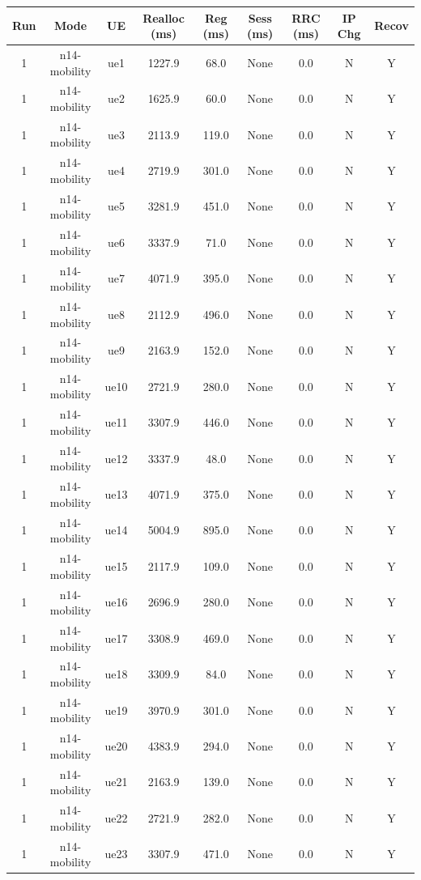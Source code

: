 \begin{table}[ht]
\centering
\begin{tabular}{|c|c|c|c|c|c|c|c|c|}
\hline
Run & Mode & UE & Realloc (ms) & Reg (ms) & Sess (ms) & RRC (ms) & IP Chg & Recov \\
\hline
1 & n14-mobility & ue1 & 1227.9 & 68.0 & None & 0.0 & N & Y \\
1 & n14-mobility & ue2 & 1625.9 & 60.0 & None & 0.0 & N & Y \\
1 & n14-mobility & ue3 & 2113.9 & 119.0 & None & 0.0 & N & Y \\
1 & n14-mobility & ue4 & 2719.9 & 301.0 & None & 0.0 & N & Y \\
1 & n14-mobility & ue5 & 3281.9 & 451.0 & None & 0.0 & N & Y \\
1 & n14-mobility & ue6 & 3337.9 & 71.0 & None & 0.0 & N & Y \\
1 & n14-mobility & ue7 & 4071.9 & 395.0 & None & 0.0 & N & Y \\
1 & n14-mobility & ue8 & 2112.9 & 496.0 & None & 0.0 & N & Y \\
1 & n14-mobility & ue9 & 2163.9 & 152.0 & None & 0.0 & N & Y \\
1 & n14-mobility & ue10 & 2721.9 & 280.0 & None & 0.0 & N & Y \\
1 & n14-mobility & ue11 & 3307.9 & 446.0 & None & 0.0 & N & Y \\
1 & n14-mobility & ue12 & 3337.9 & 48.0 & None & 0.0 & N & Y \\
1 & n14-mobility & ue13 & 4071.9 & 375.0 & None & 0.0 & N & Y \\
1 & n14-mobility & ue14 & 5004.9 & 895.0 & None & 0.0 & N & Y \\
1 & n14-mobility & ue15 & 2117.9 & 109.0 & None & 0.0 & N & Y \\
1 & n14-mobility & ue16 & 2696.9 & 280.0 & None & 0.0 & N & Y \\
1 & n14-mobility & ue17 & 3308.9 & 469.0 & None & 0.0 & N & Y \\
1 & n14-mobility & ue18 & 3309.9 & 84.0 & None & 0.0 & N & Y \\
1 & n14-mobility & ue19 & 3970.9 & 301.0 & None & 0.0 & N & Y \\
1 & n14-mobility & ue20 & 4383.9 & 294.0 & None & 0.0 & N & Y \\
1 & n14-mobility & ue21 & 2163.9 & 139.0 & None & 0.0 & N & Y \\
1 & n14-mobility & ue22 & 2721.9 & 282.0 & None & 0.0 & N & Y \\
1 & n14-mobility & ue23 & 3307.9 & 471.0 & None & 0.0 & N & Y \\

\end{tabular}
\end{table}
